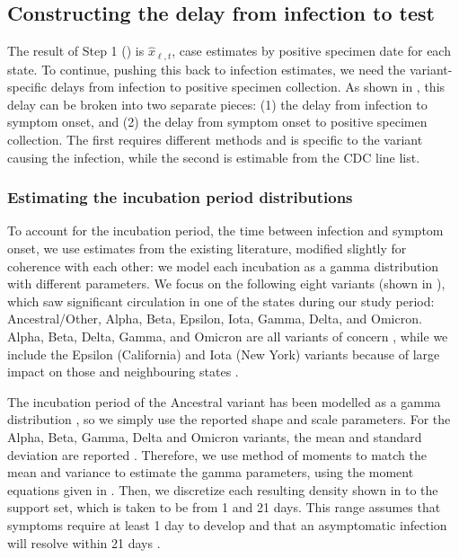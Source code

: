     


\subsection{Constructing the delay from infection to test}
\label{supp:delay-sops}

The result of Step 1 () is $\widehat{x}_{\ell,t}$, case
estimates by positive specimen date for each state. To continue, pushing this
back to infection estimates, we need the variant-specific delays from infection
to positive specimen collection. As shown in , this delay can be broken into two separate pieces: (1) the
delay from infection to symptom onset, and (2) the delay from symptom onset to
positive specimen collection. The first requires different methods and is
specific to the variant causing the infection, while the second is estimable from the CDC line
list.

\subsubsection{Estimating the incubation period distributions} 
\label{sec:incubation}

To account for the incubation period, the time between infection and symptom
onset, we use estimates from the existing literature, modified slightly for
coherence with each other: we model each incubation as a gamma distribution with
different parameters. We focus on the following eight variants (shown in
), which saw significant circulation in one of the \US states
during our study period: Ancestral/Other, Alpha, Beta, Epsilon,
Iota, Gamma, Delta, and Omicron. Alpha, Beta, Delta, Gamma, and Omicron are all
variants of concern \citep{who2021tracking}, while we include the Epsilon
(California) and Iota (New York) variants because of large impact on those and
neighbouring states \citep{yang2022investigation, duerr2021dominance}.

The incubation period of the Ancestral variant has been modelled as a gamma
distribution \citep{tindale2020evidence}, so we simply use the reported shape
and scale parameters. For the Alpha, Beta, Gamma, Delta and Omicron variants,
the mean and standard deviation are reported \citep{tanaka2022shorter,
grant2022impact, ogata2022shorter}. Therefore, we use method of moments to match
the mean and variance to estimate the gamma parameters, using the moment
equations given in . Then, we discretize each resulting density
shown in  to the support set, which is taken to be from 1
and 21 days. This range assumes that symptoms require at least 1 day to develop
\citealp{phcan2021covid} and that an asymptomatic infection will resolve within
21 days \citep{zaki2021estimations,cortes2022sars}.


